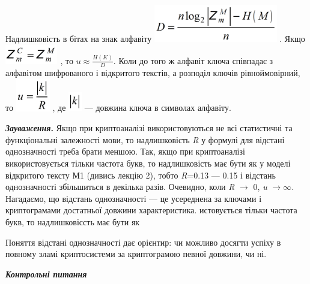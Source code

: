 Надлишковість в бітах на знак алфавіту 
\includegraphics[width=2.122in,height=0.65in]{crypt-img/crypt-img51.png} . Якщо
  \includegraphics[width=0.9047in,height=0.3311in]{crypt-img/crypt-img52.png} ,
 то   $u\approx \frac{H(K)}D$.  Коли до того ж алфавіт ключа співпадає з
алфавітом шифрованого і відкритого текстів, а розподіл ключів  рівноймовірний,
то  
\includegraphics[width=0.5862in,height=0.5665in]{crypt-img/crypt-img53.png} , 
де  
\includegraphics[width=0.2291in,height=0.3335in]{crypt-img/crypt-img54.png}  ---
довжина ключа в символах алфавіту.

\textbf{\textit{Зауваження}}\textbf{.} Якщо при криптоаналізі використовуються
не всі статистичні та функціональні залежності мови, то надлишковість
\textit{R}\textit{ }у формулі для відстані однозначності треба брати меншою.
Так, якщо при криптоаналізі використовується тільки частота букв, то
надлишковість має бути як у моделі відкритого тексту М1 (дивись лекцію 2),
тобто \textit{R}=0.13 --- 0.15  і відстань однозначності  збільшиться в декілька
разів.  Очевидно, коли  \textit{R} $\rightarrow $ 0,\textit{  u}
$\rightarrow \infty $\textit{.  }Нагадаємо, що відстань однозначності --- це
усереднена за ключами і криптограмами достатньої  довжини характеристика. 
истовується тільки частота букв, то надлишковіссть має бути як

Поняття відстані однозначності дає орієнтир: чи можливо досягти успіху в повному
зламі криптосистеми за криптограмою певної довжини, чи ні.


\bigskip


\bigskip

{\centering\bfseries\itshape
Контрольні питання
\par}


\bigskip


\bigskip

